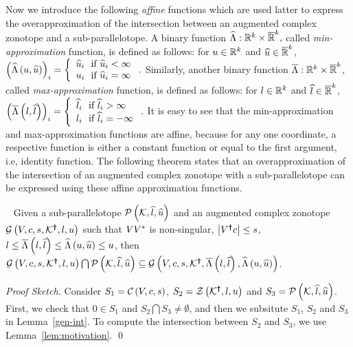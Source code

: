 Now we introduce the following \emph{affine} functions which are used latter to
express the overapproximation of the intersection between an augmented
complex zonotope and a sub-parallelotope.
%
A binary function
$\widehat{\Lambda}:\mathbb{R}^k\times\mathbb{\overline{R}}^k,$
called \emph{min-approximation} function, is defined as follows: for
$u\in\mathbb{R}^k$ and $\widehat{u}\in\mathbb{\overline{R}}^k$,
$\left(\widehat{\Lambda}\left(u,\widehat{u}\right)\right)_i = \left\{
\begin{array}{l}
\widehat{u}_i~~\text{if}~\widehat{u}_i<\infty\\
u_i~~\text{if}~\widehat{u}_i=\infty
\end{array}
\right..$
Similarly, another binary function       
$\overline{\Lambda}:\mathbb{R}^k\times\mathbb{\overline{R}}^k$,
called \emph{max-approximation} function, is defined as follows: for
$l\in\mathbb{R}^k$ and $\widehat{l}\in\mathbb{\overline{R}}^k$,
$\left(\overline{\Lambda}\left(l,\widehat{l}\right)\right)_i = \left\{
\begin{array}{l}
\widehat{l}_i~~\text{if}~\widehat{l}_i>\infty\\
l_i~~\text{if}~\widehat{l}_i=-\infty
\end{array}
\right..$
It is easy to see that the min-approximation and max-approximation functions are affine, because for any one coordinate, a respective function is either a constant function or equal to the first argument, i.e, identity function.
%
The following theorem states that an overapproximation of the intersection
of an augmented complex zonotope with a sub-parallelotope can be
expressed using these affine approximation functions.
%
\begin{theorem}~\label{thm:acz-int}
Given a sub-parallelotope $\mathcal{P}\left(\mathcal{K},\widehat{l},\widehat{u}\right)$ and an
augmented complex zonotope $\mathcal{G}\left(V,c,s,\mathcal{K}^{\bm{\dagger}},l,u\right)$
such that $VV^*$ is non-singular, $\left|V^{\bm{\dagger}}c\right|\leq s$, $l\leq
\overline{\Lambda}\left(l,\widehat{l}\right)\leq \widehat{\Lambda}\left(u,\widehat{u}\right)\leq u$, then
$\mathcal{G}\left(V,c,s,\mathcal{K}^{\bm{\dagger}},l,u\right)\bigcap\mathcal{P}\left(\mathcal{K},\widehat{l},\widehat{u}\right)\subseteq
\mathcal{G}\left(V,c,s,\mathcal{K}^{\bm{\dagger}},\overline{\Lambda}\left(l,\widehat{l}\right),\widehat{\Lambda}\left(u,\widehat{u}\right)\right)$.
%
\end{theorem}
\emph{Proof Sketch.}  Consider $S_1 = \mathcal{C}\left(V,c,s\right)$, $S_2 =
\mathcal{Z}\left(\mathcal{K}^{\bm{\dagger}},l,u\right)$ and $S_3 =
\mathcal{P}\left(\mathcal{K},\widehat{l},\widehat{u}\right)$.  First, we check that $0\in S_1$
and $S_2\bigcap S_3\neq \emptyset$, and then we subsitute $S_1$, $S_2$
and $S_3$ in Lemma~\ref{gen-int}.  To compute the intersection
between $S_2$ and $S_3$, we use Lemma~\ref{lem:motivation}.  %
\qed


